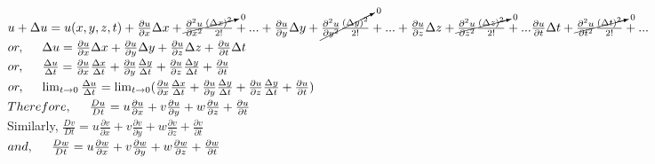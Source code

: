 \documentclass{book}
\begin{document}
\begin{center}
$u+\Delta u=u(x,y,z,t)+\frac{\partial u}{\partial x}\Delta x+\cancelto{0}{\frac{\partial^2 u}{\partial x^2}\frac{(\Delta x)^2}{2!}}+...+\frac{\partial u}{\partial y}\Delta y+\cancelto{0}{\frac{\partial^2 u}{\partial y^2}\frac{(\Delta y)^2}{2!}}+...+\frac{\partial u}{\partial z}\Delta z+\cancelto{0}{\frac{\partial^2 u}{\partial z^2}\frac{(\Delta z)^2}{2!}}+...\frac{\partial u}{\partial t}\Delta t+\cancelto{0}{\frac{\partial^2 u}{\partial t^2}\frac{(\Delta t)^2}{2!}}+...$
\\
\vspace{0.5cm}
$or,\hspace{0.5cm}\Delta u=\frac{\partial u}{\partial x}\Delta x+\frac{\partial u}{\partial y}\Delta y+\frac{\partial u}{\partial z}\Delta z+\frac{\partial u}{\partial t}\Delta t$
\\
\vspace{0.5cm}
$or,\hspace{0.5cm}\frac{\Delta u}{\Delta t}=\frac{\partial u}{\partial x}\frac{\Delta x}{\Delta t}+\frac{\partial u}{\partial y}\frac{\Delta y}{\Delta t}+\frac{\partial u}{\partial z}\frac{\Delta y}{\Delta t}+\frac{\partial u}{\partial t}$
\\
\vspace{0.5cm}
$or,\hspace{0.5cm}\lim_{t\to0}\frac{\Delta u}{\Delta t}=\lim_{t\to0}(\frac{\partial u}{\partial x}\frac{\Delta x}{\Delta t}+\frac{\partial u}{\partial y}\frac{\Delta y}{\Delta t}+\frac{\partial u}{\partial z}\frac{\Delta y}{\Delta t}+\frac{\partial u}{\partial t})$
\\
\vspace{0.5cm}
$Therefore,\hspace{0.5cm} \frac{Du}{Dt}=u\frac{\partial u}{\partial x}+v\frac{\partial u}{\partial y}+w\frac{\partial u}{\partial z}+\frac{\partial u}{\partial t}$
\\
\vspace{1cm}
Similarly,\hspace{0.5cm}
$\frac{Dv}{Dt}=u\frac{\partial v}{\partial x}+v\frac{\partial v}{\partial y}+w\frac{\partial v}{\partial z}+\frac{\partial v}{\partial t}$
\\
\vspace{1cm}
$and,\hspace{0.5cm}\frac{Dw}{Dt}=u\frac{\partial w}{\partial x}+v\frac{\partial w}{\partial y}+w\frac{\partial w}{\partial z}+\frac{\partial w}{\partial t}$

\end{center}
\end{document}
